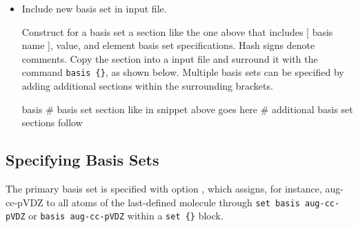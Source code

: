 \begin{itemize}
\item Include new basis set in input file.

Construct for a basis set a section like the one above that includes [ basis name ], 
value, and element basis set specifications. Hash signs denote comments.
Copy the section into a \PSIfour input file and surround it with the command \texttt{basis \{\}}, 
as shown below.
Multiple basis sets can be specified by adding additional sections within the surrounding brackets.
\begin{Snippet}
basis {
# basis set section like in snippet above goes here
# additional basis set sections follow
}
\end{Snippet}
\end{itemize}


\subsection{Specifying Basis Sets}

The primary basis set is specified with option , which assigns,
for instance, aug-cc-pVDZ to all atoms of the last-defined molecule through
\texttt{set basis aug-cc-pVDZ} or \texttt{basis aug-cc-pVDZ} within a \texttt{set \{\}} block.




